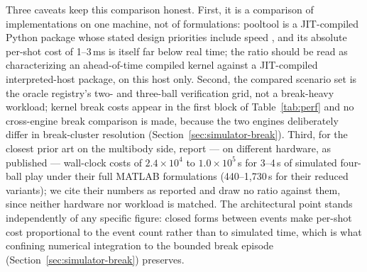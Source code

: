 Three caveats keep this comparison honest. First, it is a comparison of
implementations on one machine, not of formulations: pooltool is a
JIT-compiled Python package whose stated design priorities include speed
\citep{kiefl2024pooltool}, and its absolute per-shot cost of 1--3\,ms is
itself far below real time; the ratio should be read as characterizing
an ahead-of-time compiled kernel against a JIT-compiled interpreted-host
package, on this host only. Second, the compared scenario set is the
oracle registry's two- and three-ball verification grid, not a
break-heavy workload; kernel break costs appear in the first block of
Table~\ref{tab:perf} and no cross-engine break comparison is made,
because the two engines deliberately differ in break-cluster resolution
(Section~\ref{sec:simulator-break}). Third, for the closest prior art on
the multibody side, \citet{gismerosmoreno2022multiple} report --- on
different hardware, as published --- wall-clock costs of
$2.4\times10^{4}$ to $1.0\times10^{5}$\,s for 3--4\,s of simulated
four-ball play under their full MATLAB formulations (440--1{,}730\,s for
their reduced variants); we cite their numbers as reported and draw no
ratio against them, since neither hardware nor workload is matched. The
architectural point stands independently of any specific figure: closed
forms between events make per-shot cost proportional to the event count
rather than to simulated time, which is what confining numerical
integration to the bounded break episode
(Section~\ref{sec:simulator-break}) preserves.


